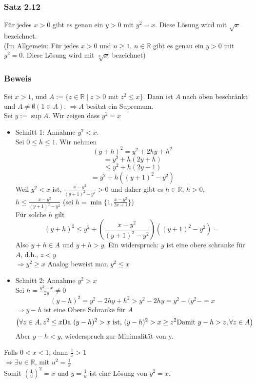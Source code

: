\subsubsection*{Satz 2.12}
Für jedes $x>0$ gibt es genau ein $y>0$ mit $y^2=x$. Diese Lösung wird mit $\sqrt{x}$ bezeichnet.\\

(Im Allgemein: Für jedes $x>0$ und $n\geq 1$, $n\in\mathbb{R}$ gibt es genau ein $y>0$ mit $y^2=0$. Diese Lösung wird mit $\sqrt[n]{x}$ bezeichnet)
\subsubsection*{Beweis}
Sei $x>1$, und $A:=\{ z\in\mathbb{R}\mid z>0$ mit $z^2\leq x\}$. Dann ist $A$ nach oben beschränkt und $A\not=\emptyset (1\in A)$. $\Rightarrow A$ besitzt ein Supremum. \\
Sei $y:=\sup A$. Wir zeigen dass $y^2=x$
\begin{itemize}
    \item Schnitt 1: Annahme $y^2<x$. \\ 
    Sei $0\leq h\leq 1$.  Wir nehmen $$\left( y+h\right)^2=y^2+2hy+h^2$$
    $$=y^2+h(2y+h)$$
    $$\leq y^2+h(2y+1)$$
    $$=y^2 +h\left( (y+1)^2 -y^2\right)$$
    Weil $y^2<x$ ist, $\frac{x-y^2}{(y+1)^2-y^2}>0$ und daher gibt es $h\in\mathbb{R}$, $h>0$, $h\leq\frac{x-y^2}{(y+1)^2-y^2}$ (sei $h=\min \{1,\frac{x-y^2}{2x+1}\}$)\\
    
    Für solche $h$ gilt $$(y+h)^2\leq y^2 + \left( \frac{x-y^2}{(y+1)^2-y^2}\right)\left( (y+1)^2 -y^2\right)=$$ Also $y+h\in A$ und $y+h>y$. Ein widerspruch: $y$ ist eine obere schranke für $A$, d.h., $z<y$\\$\Rightarrow y^2\geq x$ Analog beweist man $y^2\leq x$
    \item Schnitt 2: Annahme $y^2>x$\\
    Sei $h=\frac{y^2-x}{2y}\not=0$ 
    $$(y-h)^2=y^2-2hy+h^2>y^2-2hy=y^2 -(y^2-=x$$
    $\Rightarrow y-h$ ist eine Obere Schranke für $A$
    $$\left( \forall z \in A, z^2\leq x\text{\newline Da }(y-h)^2>x \text{ ist, } (y-h)^2>x\geq z^2\text{\newline Damit } y-h>z, \forall z \in A\right)$$
    Aber $y-h<y$, wiederspruch zur Minimalität von y.
\end{itemize}
Falls $0<x<1$, dann $\frac{1}{x}>1$\\
$\Rightarrow \exists u\in\mathbb{R}$, mit $u^2=\frac{1}{x}$\\
Somit $\left( \frac{1}{u}\right)^2=x$ und $y=\frac{1}{u}$ ist eine Lösung von $y^2=x$.\\

